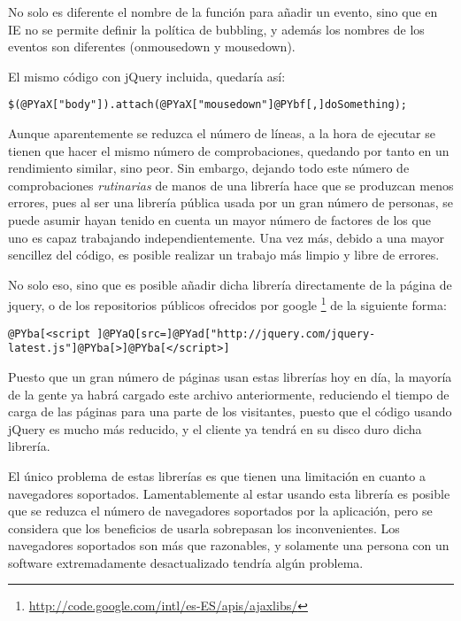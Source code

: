 No solo es diferente el nombre de la función para añadir un evento, sino que en IE no se permite definir la política de bubbling, y además los nombres de los eventos son diferentes (onmousedown y mousedown).

El mismo código con jQuery incluida, quedaría así:

\begin{Verbatim}[commandchars=@\[\]]
$(@PYaX["body"]).attach(@PYaX["mousedown"]@PYbf[,]doSomething);
\end{Verbatim}


Aunque aparentemente se reduzca el número de líneas, a la hora de ejecutar se tienen que hacer el mismo número de comprobaciones, quedando por tanto en un rendimiento similar, sino peor. Sin embargo, dejando todo este número de comprobaciones \emph{rutinarias} de manos de una librería hace que se produzcan menos errores, pues al ser una librería pública usada por un gran número de personas, se puede asumir hayan tenido en cuenta un mayor número de factores de los que uno es capaz trabajando independientemente. Una vez más, debido a una mayor sencillez del código, es posible realizar un trabajo más limpio y libre de errores.

No solo eso, sino que es posible añadir dicha librería directamente de la página de jquery, o de los repositorios públicos ofrecidos por google \footnote{\url{http://code.google.com/intl/es-ES/apis/ajaxlibs/}} de la siguiente forma:

\begin{Verbatim}[commandchars=@\[\]]
@PYba[<script ]@PYaQ[src=]@PYad["http://jquery.com/jquery-latest.js"]@PYba[>]@PYba[</script>]
\end{Verbatim}


Puesto que un gran número de páginas usan estas librerías hoy en día, la mayoría de la gente ya habrá cargado este archivo anteriormente, reduciendo el tiempo de carga de las páginas para una parte de los visitantes, puesto que el código usando jQuery es mucho más reducido, y el cliente ya tendrá en su disco duro dicha librería.

El único problema de estas librerías es que tienen una limitación en cuanto a navegadores soportados. Lamentablemente al estar usando esta librería es posible que se reduzca el número de navegadores soportados por la aplicación, pero se considera que los beneficios de usarla sobrepasan los inconvenientes. Los navegadores soportados son más que razonables, y solamente una persona con un software extremadamente desactualizado tendría algún problema.
